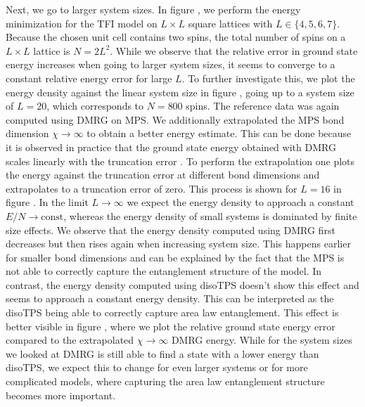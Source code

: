 Next, we go to larger system sizes. In figure , we perform the energy minimization for the TFI model on $L\times L$ square lattices with $L\in\{4,5,6,7\}$. Because the chosen unit cell contains two spins, the total number of spins on a $L\times L$ lattice is $N = 2L^2$. While we observe that the relative error in ground state energy increases when going to larger system sizes, it seems to converge to a constant relative energy error for large $L$. To further investigate this, we plot the energy density against the linear system size in figure , going up to a system size of $L = 20$, which corresponds to $N = 800$ spins. The reference data was again computed using DMRG on MPS. We additionally extrapolated the MPS bond dimension $\chi\rightarrow\infty$ to obtain a better energy estimate. This can be done because it is observed in practice that the ground state energy obtained with DMRG scales linearly with the truncation error \cite{cite:accuracy_of_DMRG}. To perform the extrapolation one plots the energy against the truncation error at different bond dimensions and extrapolates to a truncation error of zero. This process is shown for $L=16$ in figure \figref{}. In the limit $L\rightarrow\infty$ we expect the energy density to approach a constant $E/N\rightarrow \text{const}$, whereas the energy density of small systems is dominated by finite size effects. We observe that the energy density computed using DMRG first decreases but then rises again when increasing system size. This happens earlier for smaller bond dimensions and can be explained by the fact that the MPS is not able to correctly capture the entanglement structure of the model. In contrast, the energy density computed using disoTPS doesn't show this effect and seems to approach a constant energy density. This can be interpreted as the disoTPS being able to correctly capture area law entanglement. This effect is better visible in figure , where we plot the relative ground state energy error compared to the extrapolated $\chi\rightarrow\infty$ DMRG energy. While for the system sizes we looked at DMRG is still able to find a state with a lower energy than disoTPS, we expect this to change for even larger systems or for more complicated models, where capturing the area law entanglement structure becomes more important. \par

